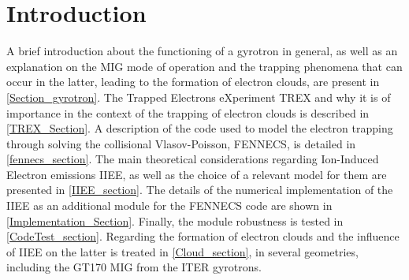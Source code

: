 \section{Introduction}



A brief introduction about the functioning of  a gyrotron in general, as well as an explanation on the MIG mode of operation and the trapping phenomena that can occur in the latter, leading to the formation of electron clouds, are present in \ref{Section_gyrotron}. The Trapped Electrons eXperiment TREX and why it is of importance in the context of the trapping of electron clouds is described in \ref{TREX_Section}. A description of the code used to model the electron trapping through solving the collisional Vlasov-Poisson, FENNECS, is detailed in \ref{fennecs_section}. The main theoretical considerations regarding Ion-Induced Electron emissions IIEE, as well as the choice of a relevant model for them are presented in \ref{IIEE_section}. The details of the numerical implementation of the IIEE as an additional module for the FENNECS code are shown in \ref{Implementation_Section}.  Finally, the module robustness is tested in \ref{CodeTest_section}.  Regarding the formation of electron clouds and the influence of IIEE on the latter is treated in \ref{Cloud_section}, in several geometries, including the GT170 MIG from the ITER gyrotrons. 